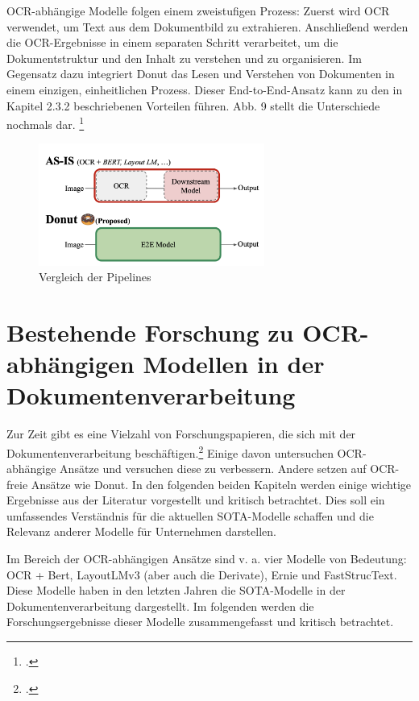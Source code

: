 OCR-abhängige Modelle folgen einem zweistufigen Prozess: Zuerst wird OCR verwendet, um Text aus dem Dokumentbild zu extrahieren. Anschließend werden die OCR-Ergebnisse in einem separaten Schritt verarbeitet, um die Dokumentstruktur und den Inhalt zu verstehen und zu organisieren. Im Gegensatz dazu integriert Donut das Lesen und Verstehen von Dokumenten in einem einzigen, einheitlichen Prozess. Dieser End-to-End-Ansatz kann zu den in Kapitel 2.3.2 beschriebenen Vorteilen führen. Abb. 9 stellt die Unterschiede nochmals dar. \footcites[Vgl.][S. 2 f.]{kim_ocr-free_2021}
\begin{figure}[h]
    \centering
    \includegraphics[height=40mm]{graphics/e2e.png}
    \caption[Vergleich der Pipelines]{Vergleich der Pipelines\footnotemark}
    \label{fig:pipelines}
\end{figure}

\section{Bestehende Forschung zu OCR-abhängigen Modellen in der Dokumentenverarbeitung}
Zur Zeit gibt es eine Vielzahl von Forschungspapieren, die sich mit der Dokumentenverarbeitung beschäftigen.\footcites[Vgl.][]{dhouib_docparser_2023,aggarwal_dublin_2023,huang_layoutlmv3_2022} Einige davon untersuchen OCR-abhängige Ansätze und versuchen diese zu verbessern. Andere setzen auf OCR-freie Ansätze wie Donut. In den folgenden beiden Kapiteln werden einige wichtige Ergebnisse aus der Literatur vorgestellt und kritisch betrachtet. Dies soll ein umfassendes Verständnis für die aktuellen SOTA-Modelle schaffen und die Relevanz anderer Modelle für Unternehmen darstellen.

Im Bereich der OCR-abhängigen Ansätze sind v. a. vier Modelle von Bedeutung: OCR + Bert, LayoutLMv3 (aber auch die Derivate), Ernie und FastStrucText. Diese Modelle haben in den letzten Jahren die SOTA-Modelle in der Dokumentenverarbeitung dargestellt. Im folgenden werden die Forschungsergebnisse dieser Modelle zusammengefasst und kritisch betrachtet.

